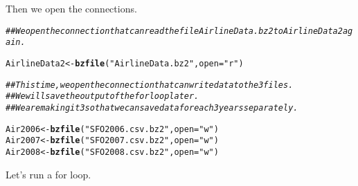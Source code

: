 \documentclass[english]{article}\usepackage[]{graphicx}\usepackage[]{color}
\makeatletter
\newcommand{\hlstr}[1]{\textcolor[rgb]{0.192,0.494,0.8}{#1}}%
\newcommand{\hlcom}[1]{\textcolor[rgb]{0.678,0.584,0.686}{\textit{#1}}}%
\newcommand{\hlstd}[1]{\textcolor[rgb]{0.345,0.345,0.345}{#1}}%
\newcommand{\hlkwb}[1]{\textcolor[rgb]{0.69,0.353,0.396}{#1}}%
\newcommand{\hlkwc}[1]{\textcolor[rgb]{0.333,0.667,0.333}{#1}}%
\newcommand{\hlkwd}[1]{\textcolor[rgb]{0.737,0.353,0.396}{\textbf{#1}}}%
\newenvironment{kframe}{%
 \def\at@end@of@kframe{}%
 \ifinner\ifhmode%
  \def\at@end@of@kframe{\end{minipage}}%
  \begin{minipage}{\columnwidth}%
 \fi\fi%
 \def\FrameCommand##1{\hskip\@totalleftmargin \hskip-\fboxsep
 \colorbox{shadecolor}{##1}\hskip-\fboxsep
     \hskip-\linewidth \hskip-\@totalleftmargin \hskip\columnwidth}%
 \MakeFramed {\advance\hsize-\width
   \@totalleftmargin\z@ \linewidth\hsize
   \@setminipage}}%
 {\par\unskip\endMakeFramed%
 \at@end@of@kframe}
\newenvironment{knitrout}{}{} %
\makeatother
\begin{document}
Then we open the connections.

\begin{knitrout}
\color{fgcolor}\begin{kframe}
\begin{alltt}
\hlcom{## We open the connection that can read the file AirlineData.bz2 to AirlineData2 again. }

\hlstd{AirlineData2} \hlkwb{<-} \hlkwd{bzfile}\hlstd{(}\hlstr{"AirlineData.bz2"}\hlstd{,} \hlkwc{open}\hlstd{=}\hlstr{"r"}\hlstd{)}

\hlcom{## This time, we open the connection that can write data to the 3 files.}
\hlcom{## We will save the output of the for loop later.}
\hlcom{## We are making it 3 so that we can save data for each 3 years separately.}

\hlstd{Air2006} \hlkwb{<-} \hlkwd{bzfile}\hlstd{(}\hlstr{"SFO2006.csv.bz2"}\hlstd{,} \hlkwc{open}\hlstd{=}\hlstr{"w"}\hlstd{)}
\hlstd{Air2007} \hlkwb{<-} \hlkwd{bzfile}\hlstd{(}\hlstr{"SFO2007.csv.bz2"}\hlstd{,} \hlkwc{open}\hlstd{=}\hlstr{"w"}\hlstd{)}
\hlstd{Air2008} \hlkwb{<-} \hlkwd{bzfile}\hlstd{(}\hlstr{"SFO2008.csv.bz2"}\hlstd{,} \hlkwc{open}\hlstd{=}\hlstr{"w"}\hlstd{)}
\end{alltt}
\end{kframe}
\end{knitrout}

Let's run a for loop.
\end{document}
